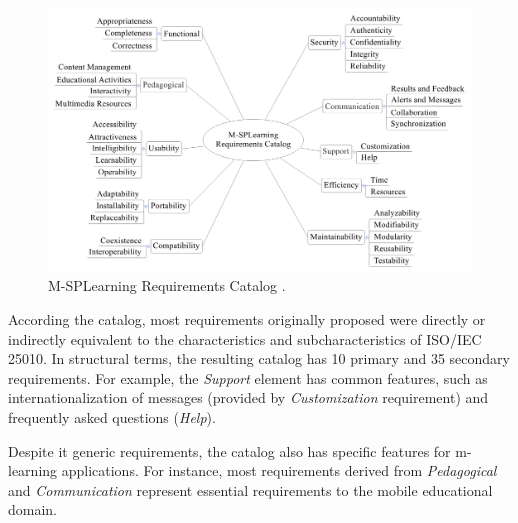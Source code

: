 \begin{figure}
    \centering
    \includegraphics[scale=0.37]{figures/section3/MSPLCatalog}
    \caption{M-SPLear\allowbreak ning Requirements Catalog \protect\cite{falvojr14b}.}
    \label{figureMSPLCatalog}
\end{figure}

According the catalog, most requirements originally proposed were directly or indirectly equivalent to the characteristics and subcharacteristics of ISO/IEC 25010. %
In structural terms, the resulting catalog has 10 primary and 35 secondary requirements. For example, the \textit{Support} element has common features, such as internationalization of messages (provided by \textit{Customization} requirement) and frequently asked questions (\textit{Help}).

Despite it generic requirements, the catalog also has specific features for m-learning applications. For instance, most requirements derived from \textit{Pedagogical} and \textit{Communication} represent essential requirements to the mobile educational domain.

